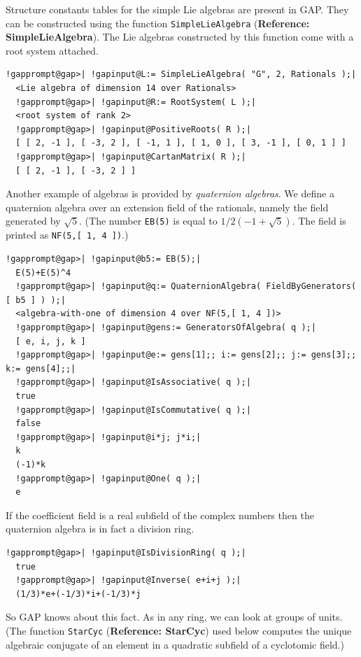 \documentclass[a4paper,11pt]{report}
\begin{document}
{{ Structure constants tables for the simple Lie algebras are present in \textsf{GAP}. They can be constructed using the function \texttt{SimpleLieAlgebra} (\textbf{Reference: SimpleLieAlgebra}). The Lie algebras constructed by this function come with a root system
attached. 

 
\begin{Verbatim}[commandchars=!@|,fontsize=\small,frame=single,label=Example]
  !gapprompt@gap>| !gapinput@L:= SimpleLieAlgebra( "G", 2, Rationals );|
  <Lie algebra of dimension 14 over Rationals>
  !gapprompt@gap>| !gapinput@R:= RootSystem( L );|
  <root system of rank 2>
  !gapprompt@gap>| !gapinput@PositiveRoots( R );|
  [ [ 2, -1 ], [ -3, 2 ], [ -1, 1 ], [ 1, 0 ], [ 3, -1 ], [ 0, 1 ] ]
  !gapprompt@gap>| !gapinput@CartanMatrix( R );|
  [ [ 2, -1 ], [ -3, 2 ] ]
\end{Verbatim}
 

 Another example of algebras is provided by \emph{quaternion algebras}. We define a quaternion algebra over an extension field of the rationals,
namely the field generated by $\sqrt{{5}}$. (The number \texttt{EB(5)} is equal to $1/2 (-1+\sqrt{{5}})$. The field is printed as \texttt{NF(5,[ 1, 4 ])}.) 

 
\begin{Verbatim}[commandchars=!@|,fontsize=\small,frame=single,label=Example]
  !gapprompt@gap>| !gapinput@b5:= EB(5);|
  E(5)+E(5)^4
  !gapprompt@gap>| !gapinput@q:= QuaternionAlgebra( FieldByGenerators( [ b5 ] ) );|
  <algebra-with-one of dimension 4 over NF(5,[ 1, 4 ])>
  !gapprompt@gap>| !gapinput@gens:= GeneratorsOfAlgebra( q );|
  [ e, i, j, k ]
  !gapprompt@gap>| !gapinput@e:= gens[1];; i:= gens[2];; j:= gens[3];; k:= gens[4];;|
  !gapprompt@gap>| !gapinput@IsAssociative( q );|
  true
  !gapprompt@gap>| !gapinput@IsCommutative( q );|
  false
  !gapprompt@gap>| !gapinput@i*j; j*i;|
  k
  (-1)*k
  !gapprompt@gap>| !gapinput@One( q );|
  e
\end{Verbatim}
 

 If the coefficient field is a real subfield of the complex numbers then the
quaternion algebra is in fact a division ring. 

 
\begin{Verbatim}[commandchars=!@|,fontsize=\small,frame=single,label=Example]
  !gapprompt@gap>| !gapinput@IsDivisionRing( q );|
  true
  !gapprompt@gap>| !gapinput@Inverse( e+i+j );|
  (1/3)*e+(-1/3)*i+(-1/3)*j
\end{Verbatim}
 

 So \textsf{GAP} knows about this fact. As in any ring, we can look at groups of units. (The
function \texttt{StarCyc} (\textbf{Reference: StarCyc}) used below computes the unique algebraic conjugate of an element in a
quadratic subfield of a cyclotomic field.) 

}}
\end{document}
